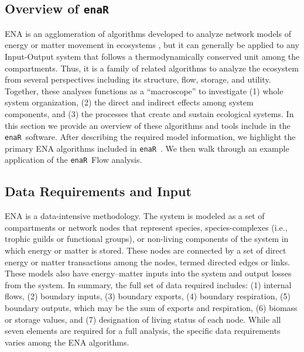 \documentclass[11pt]{article}
\newcommand{\enaR}{\texttt{enaR}}
\begin{document}
\begin{spacing}{2}
\section{Overview of \enaR}
ENA is an agglomeration of algorithms developed to analyze network
models of energy or matter movement in ecosystems
\citep[e.g.,][]{hannon73, fath99_review, ulanowicz86}, but it can
generally be applied to any Input-Output system that follows a
thermodynamically conserved unit among the compartments.  Thus, it is a
family of related algorithms to analyze the ecosystem from several
perspectives including its structure, flow, storage, and utility.
Together, these analyses functions as a ``macroscope'' to investigate
(1) whole system organization, (2) the direct and indirect effects
among system components, and (3) the processes that create and sustain
ecological systems.
In this section we provide an overview of these algorithms and tools
include in the \enaR\ software.  After describing the required model
information, we highlight the primary ENA algorithms included in
\enaR\ .  We then walk through an example application of the \enaR\ Flow
analysis.

\subsection{Data Requirements and Input}
ENA is a data-intensive methodology.  The system is modeled as a set
of compartments or network nodes that represent species,
species-complexes (i.e., trophic guilds or functional groups), or
non-living components of the system in which energy or matter is
stored.  These nodes are connected by a set of direct energy or matter
transactions among the nodes, termed directed edges or links.  These
models also have energy--matter inputs into the system and output
losses from the system.  In summary, the full set of data required includes:
(1) internal flows, (2) boundary inputs, (3) boundary exports, (4)
boundary respiration, (5) boundary outputs, which may be the sum of
exports and respiration, (6) biomass or storage values, and (7)
designation of living status of each node.  While all seven elements
are required for a full analysis, the specific data requirements
varies among the ENA algorithms.


\end{spacing}
\end{document}
